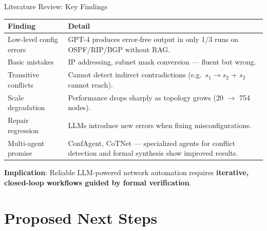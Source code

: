 \documentclass[11pt,aspectratio=169]{beamer}
\begin{document}
\begin{frame}{Literature Review: Key Findings}
  \begin{table}
    \footnotesize
    \begin{tabular}{p{2.8cm}p{6.5cm}}
      \toprule
      \textbf{Finding} & \textbf{Detail} \\
      \midrule
      Low-level config errors &
        GPT-4 produces error-free output in only 1/3 runs on OSPF/RIP/BGP
        without RAG. \\
      Basic mistakes &
        IP addressing, subnet mask conversion --- fluent but wrong. \\
      Transitive conflicts &
        Cannot detect indirect contradictions (e.g.\ $s_1\to s_2$ +
        $s_2$ cannot reach). \\
      Scale degradation &
        Performance drops sharply as topology grows (20 $\to$ 754 nodes). \\
      Repair regression &
        LLMs introduce new errors when fixing misconfigurations. \\
      Multi-agent promise &
        ConfAgent, CoTNet --- specialized agents for conflict detection and
        formal synthesis show improved results. \\
      \bottomrule
    \end{tabular}
  \end{table}

  \vspace{4pt}
  \textbf{Implication}: Reliable LLM-powered network automation requires
  \textbf{iterative, closed-loop workflows guided by formal verification}.
\end{frame}

\section{Proposed Next Steps}
\end{document}
